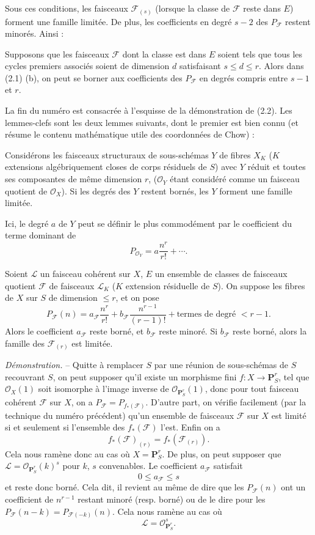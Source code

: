 Sous ces conditions, les faisceaux $\mathcal F_{(s)}$ (lorsque la classe de
$\mathcal F$ reste dans $E$) forment une famille limitée. De plus, les
coefficients en degré $s-2$ des $P_{\mathcal F}$ restent minorés.
Ainsi :

 Supposons que les faisceaux $\mathcal F$ dont la classe
est dans $E$ soient tels que tous les cycles premiers associés soient de
dimension $d$ satisfaisant $s\leq d\leq r$. Alors dans (2.1) (b), on peut se
borner aux coefficients des $P_{\mathcal F}$ en degrés compris entre $s-1$ et
$r$.

La fin du numéro est consacrée à l'esquisse de la démonstration de (2.2). Les
lemmes-clefs sont les deux lemmes suivants, dont le premier est bien connu (et
résume le contenu mathématique utile des coordonnées de Chow) :

 Considérons les faisceaux structuraux de
sous-schémas $Y$ de fibres $X_K$ ($K$ extensions algébriquement closes de corps
résiduels de $S$) avec $Y$ réduit et toutes ses composantes de même dimension
$r$, ($\mathcal O_Y$ étant considéré comme un faisceau quotient de
$\mathcal O_X$). Si les degrés des $Y$ restent bornés, les $Y$ forment une
famille limitée.

Ici, le degré $a$ de $Y$ peut se définir le plus commodément par le coefficient
du terme dominant de
\[
P_{\mathcal O_Y}=a\frac{n^r}{r!}+\cdots.
\]

 Soient $\mathcal L$ un faisceau cohérent sur $X$, $E$ un
ensemble de classes de faisceaux quotient $\mathcal F$ de faisceaux
$\mathcal L_K$ ($K$ extension résiduelle de $S$). On suppose les fibres de $X$
sur $S$ de dimension $\leq r$, et on pose
\[
P_{\mathcal F}(n)=a_{\mathcal F}\frac{n^r}{r!}
+b_{\mathcal F}\frac{n^{r-1}}{(r-1)!}
+\text{termes de degré $<r-1$}.
\]
Alors le coefficient $a_{\mathcal F}$ reste borné, et $b_{\mathcal F}$ reste
minoré. Si $b_{\mathcal F}$ reste borné, alors la famille des
$\mathcal F_{(r)}$ est limitée.

\emph{Démonstration.} -- Quitte à remplacer $S$ par une réunion de sous-schémas
de $S$ recouvrant $S$, on peut supposer qu'il existe un morphisme fini
$f:X\longrightarrow\mathbf P^r_S$, tel que $\mathcal O_X(1)$ soit isomorphe à
l'image inverse de $\mathcal O_{\mathbf P^r_S}(1)$, donc pour tout faisceau
cohérent $\mathcal F$ sur $X$, on a
$P_{\mathcal F}=P_{f_*(\mathcal F)}$. D'autre part, on vérifie facilement (par
la technique du numéro précédent) qu'un ensemble de faisceaux $\mathcal F$ sur
$X$ est limité si et seulement si l'ensemble des $f_*(\mathcal F)$ l'est.
Enfin on a
\[
f_*(\mathcal F)_{(r)}=f_*(\mathcal F_{(r)}).
\]
Cela nous ramène donc au cas où $X=\mathbf P^r_S$. De plus, on peut supposer
que $\mathcal L=\mathcal O_{\mathbf P^r_S}(k)^s$ pour $k$, $s$ convenables. Le
coefficient $a_{\mathcal F}$ satisfait
\[
0\leq a_{\mathcal F}\leq s
\]
et reste donc borné. Cela dit, il revient au même de dire que les
$P_{\mathcal F}(n)$ ont un coefficient de $n^{r-1}$ restant minoré (resp.
borné) ou de le dire pour les
$P_{\mathcal F}(n-k)=P_{\mathcal F(-k)}(n)$. Cela nous ramène au cas où
\[
\mathcal L=\mathcal O_{\mathbf P^r_S}^{s}.
\]


